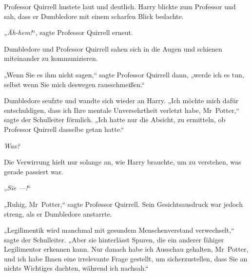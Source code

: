 Professor Quirrell hustete laut und deutlich. Harry blickte zum Professor und sah, dass er Dumbledore mit einem scharfen Blick bedachte.

„\emph{Äh-hem!}“, sagte Professor Quirrell erneut.

Dumbledore und Professor Quirrell sahen sich in die Augen und schienen miteinander zu kommunizieren.

„Wenn Sie es ihm nicht sagen,“ sagte Professor Quirrell dann, „werde ich es tun, selbst wenn Sie mich deswegen rausschmeißen.“

Dumbledore seufzte und wandte sich wieder an Harry. „Ich möchte mich dafür entschuldigen, dass ich Ihre mentale Unversehrtheit verletzt habe, Mr~Potter,“ sagte der Schulleiter förmlich. „Ich hatte nur die Absicht, zu ermitteln, ob Professor Quirrell dasselbe getan hatte.“

\emph{Was?}

Die Verwirrung hielt nur solange an, wie Harry brauchte, um zu verstehen, was gerade passiert war.

„\emph{Sie —!}“

„Ruhig, Mr~Potter,“ sagte Professor Quirrell. Sein Gesichtsausdruck war jedoch streng, als er Dumbledore anstarrte.

„Legilimentik wird manchmal mit gesundem Menschenverstand verwechselt,“ sagte der Schulleiter. „Aber sie hinterlässt Spuren, die ein anderer fähiger Legilimentor erkennen kann. Nur danach habe ich Ausschau gehalten, Mr~Potter, und ich habe Ihnen eine irrelevante Frage gestellt, um sicherzustellen, dass Sie an nichts Wichtiges dachten, während ich nachsah.“

